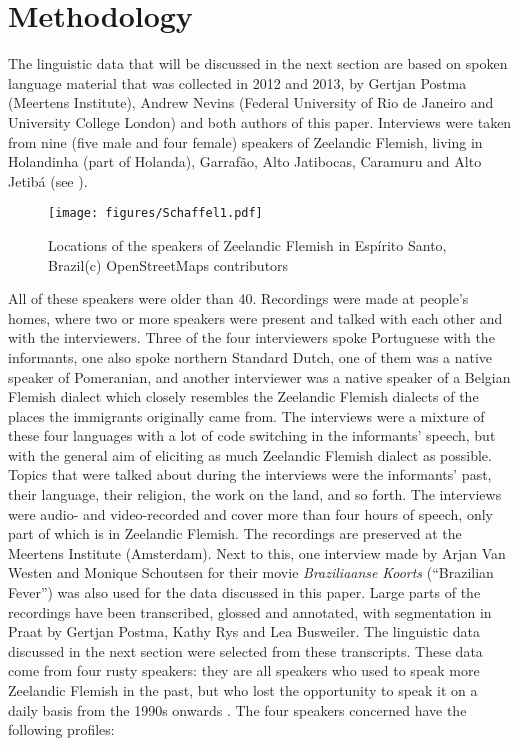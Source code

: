 \documentclass[output=paper,hidelinks,draftmode]{langscibook}
\begin{document}
\section{Methodology}

The linguistic data that will be discussed in the next section are based on spoken language material that was collected in 2012 and 2013, by Gertjan Postma (Meertens Institute), Andrew Nevins (Federal University of Rio de Janeiro and University College London) and both authors of this paper. Interviews were taken from nine (five male and four female) speakers of Zeelandic Flemish, living in Holandinha (part of Holanda), Garrafão, Alto Jatibocas, Caramuru and Alto Jetibá (see ).


\begin{figure}

\texttt{[image: figures/Schaffel1.pdf]}
\caption{Locations of the speakers of Zeelandic Flemish in Espírito Santo, Brazil\tiny (c) OpenStreetMaps contributors}
	\label{fig:schaffel:1}
\end{figure}


All of these speakers were older than 40. Recordings were made at people’s homes, where two or more speakers were present and talked with each other and with the interviewers. Three of the four interviewers spoke Portuguese with the informants, one also spoke northern Standard Dutch, one of them was a native speaker of Pomeranian, and another interviewer was a native speaker of a Belgian Flemish dialect which closely resembles the Zeelandic Flemish dialects of the places the immigrants originally came from. The interviews were a mixture of these four languages with a lot of code switching in the informants’ speech, but with the general aim of eliciting as much Zeelandic Flemish dialect as possible. Topics that were talked about during the interviews were the informants’ past, their language, their religion, the work on the land, and so forth. The interviews were audio- and video-recorded and cover more than four hours of speech, only part of which is in Zeelandic Flemish. The recordings are preserved at the Meertens Institute (Amsterdam). Next to this, one interview made by Arjan Van Westen and Monique Schoutsen for their movie \textit{Braziliaanse} \textit{Koorts} (``Brazilian Fever'') was also used for the data discussed in this paper. Large parts of the recordings have been transcribed, glossed and annotated, with segmentation in Praat by Gertjan Postma, Kathy Rys and Lea Busweiler. The linguistic data discussed in the next section were selected from these transcripts. These data come from four rusty speakers: they are all speakers who used to speak more Zeelandic Flemish in the past, but who lost the opportunity to speak it on a daily basis from the 1990s onwards \citep{Schaffel2010}. The four speakers concerned have the following profiles:
\end{document}
